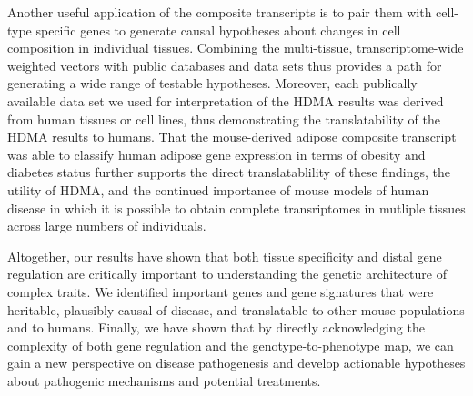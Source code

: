 Another useful application of the composite transcripts is
to pair them with cell-type specific genes to generate causal 
hypotheses about changes in cell composition in individual tissues. 
Combining the multi-tissue, transcriptome-wide weighted vectors 
with public databases and data sets thus provides a path for 
generating a wide range of testable hypotheses. Moreover, each 
publically available data set we used for interpretation of the
HDMA results was derived from human tissues or cell lines, thus 
demonstrating the translatability of the HDMA results to humans. 
That the mouse-derived adipose composite transcript was able to 
classify human adipose gene expression in terms of obesity 
and diabetes status further supports the direct translatablility 
of these findings, the utility of HDMA, and the continued 
importance of mouse models of human disease in which it is 
possible to obtain complete transriptomes in mutliple tissues 
across large numbers of individuals. 
 
Altogether, our results have shown that both tissue specificity and 
distal gene regulation are critically important to understanding 
the genetic architecture of complex traits. We identified important 
genes and gene signatures that were heritable, plausibly causal of 
disease, and translatable to other mouse populations and to humans. 
Finally, we have shown that by directly acknowledging the complexity 
of both gene regulation and the genotype-to-phenotype map, we can gain 
a new perspective on disease pathogenesis and develop actionable 
hypotheses about pathogenic mechanisms and potential treatments. 